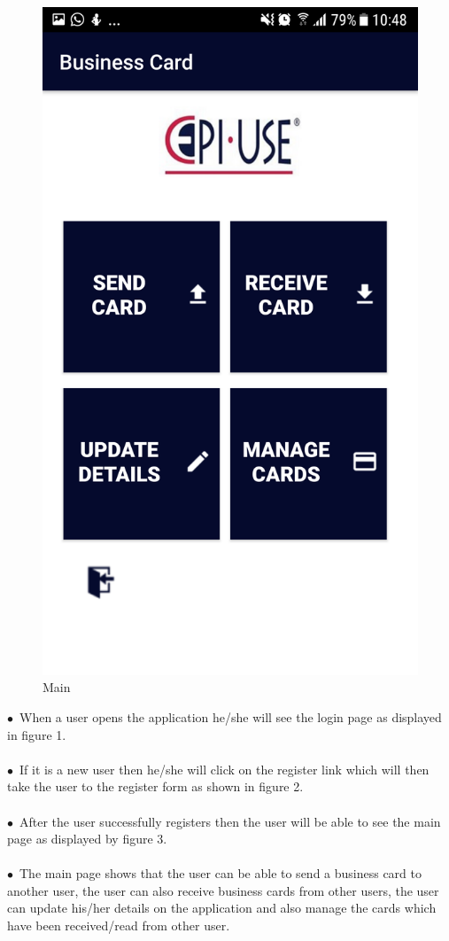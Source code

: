 \documentclass[english]{article}
\begin{document}
\begin{figure}[!htb]
  \includegraphics[width=\linewidth]{Main.png}
  \caption{Main}\label{Main}
\endminipage
\end{figure}

								
$\bullet$\ When a user opens the application he/she will see the login page as displayed in figure 1.\\ \\$\bullet$\ If it is a new user then he/she will click on the register link which will then take the user to the register form as shown in figure 2.\\ \\$\bullet$\ After the user successfully registers then the user will be able to see the main page as displayed by figure 3.\\ \\$\bullet$\ The main page shows that the user can be able to send a business card to another user, the user can also receive business cards from other users, the user can update his/her details on the application and also manage the cards which have been received/read from other user.
\end{document}
